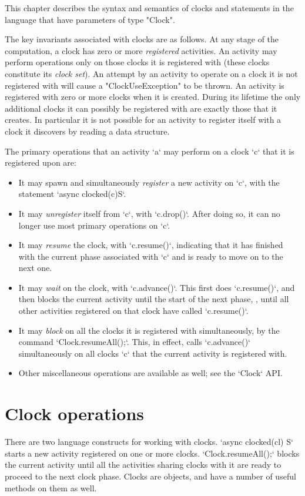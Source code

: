 This chapter describes the syntax and semantics of clocks and
statements in the language that have parameters of type \xcd"Clock". 

The key invariants associated with clocks are as follows.  At any
stage of the computation, a clock has zero or more {\em registered}
activities. An activity may perform operations only on those clocks it
is registered with (these clocks constitute its {\em clock set}). 
An attempt by an activity to operate on a clock it is not registered with
will cause a 
\xcd"ClockUseException"
to be thrown.  
An activity is registered with zero or more clocks when it is created.
During its lifetime the only additional clocks it can possibly be registered with
are exactly those that it creates. In particular it is not possible
for an activity to register itself with a clock it discovers by
reading a data structure.

The primary operations that an activity \xcd`a` may perform on a clock \xcd`c`
that it is registered upon are: 
\begin{itemize}
\item It may spawn and simultaneously  {\em register} a new activity on
      \xcd`c`, with the statement       \xcd`async clocked(c)S`.
\item It may {\em unregister} itself from \xcd`c`, with \xcd`c.drop()`.  After
      doing so, it can no longer use most primary operations on \xcd`c`.
\item It may {\em resume} the clock, with \xcd`c.resume()`, indicating that it
      has finished with the current phase associated with \xcd`c` and is ready
      to move on to the next one.
\item It may {\em wait} on the clock, with \xcd`c.advance()`.  This first does
      \xcd`c.resume()`, and then blocks the current activity until the start
      of the next phase, \viz, until all other activities registered on that
      clock have called \xcd`c.resume()`.
\item It may {\em block} on all the clocks it is registered with
      simultaneously, by the command \xcd`Clock.resumeAll();`.  This, in effect, calls
      \xcd`c.advance()` simultaneously 
      on all clocks \xcd`c` that the current activity is registered with.
\item Other miscellaneous operations are available as well; see the
      \xcd`Clock` API.
\end{itemize}


\section{Clock operations}\label{sec:clock}
There are two language constructs for working with clocks. 
\xcd`async clocked(cl) S` starts a new activity registered on one or more
clocks.  \xcd`Clock.resumeAll();` blocks the current activity until all the activities
sharing clocks with it are ready to proceed to the next clock phase. 
Clocks are objects, and have a number of useful methods on them as well.

